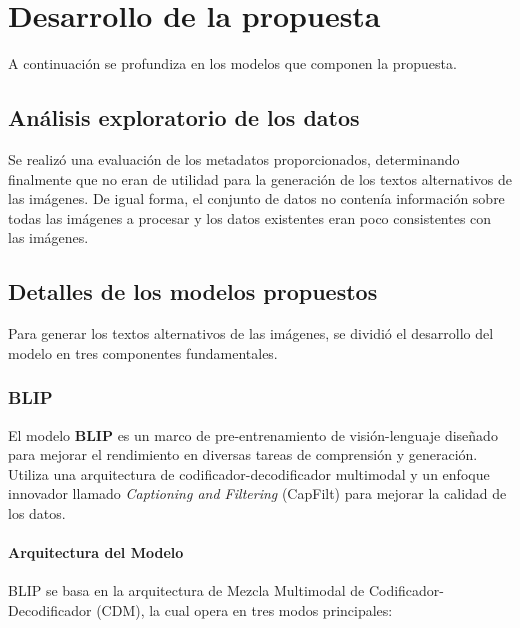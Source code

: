 
\chapter{Desarrollo de la propuesta}\label{chapter:desarrollo}
A continuación se profundiza en los modelos que componen la propuesta.

\section{Análisis exploratorio de los datos}
Se realizó una evaluación de los metadatos proporcionados, determinando finalmente que no eran de utilidad para la generación de los textos alternativos de las imágenes. De igual forma, el conjunto de datos no contenía información sobre todas las imágenes a procesar y los datos existentes eran poco consistentes con las imágenes.

\section{Detalles de los modelos propuestos}
Para generar los textos alternativos de las imágenes, se dividió el desarrollo del modelo en tres componentes fundamentales.

	\subsection{BLIP}

		El modelo \textbf{BLIP} \cite{li2022blip} es un marco de pre-entrenamiento de visión-lenguaje diseñado para mejorar el rendimiento en diversas tareas de comprensión y generación. Utiliza una arquitectura de codificador-decodificador multimodal  y un enfoque innovador llamado \textit{Captioning and Filtering} (CapFilt) para mejorar la calidad de los datos.

		\subsubsection*{Arquitectura del Modelo}

			BLIP se basa en la arquitectura de Mezcla Multimodal de Codificador-Decodificador (CDM), la cual opera en tres modos principales:


